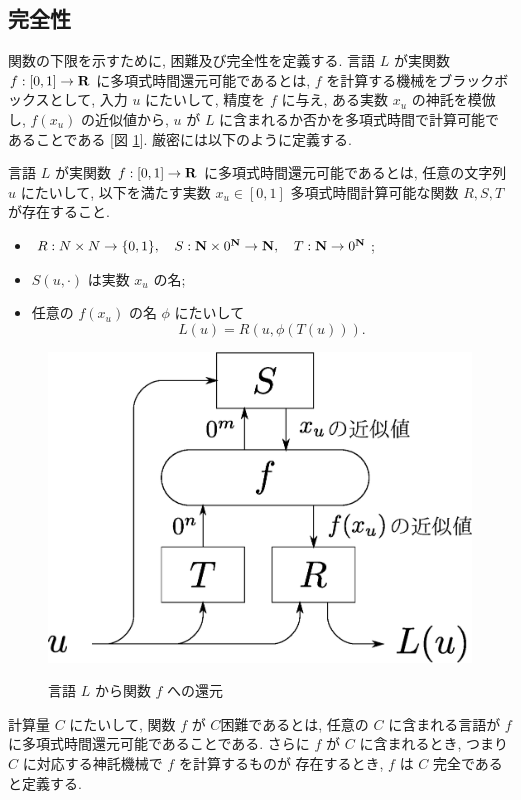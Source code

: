 \subsection{完全性}

 関数の下限を示すために, 困難及び完全性を定義する.
 言語 $L$ が実関数 $f:[0,1] \to \mathbf R$ に多項式時間還元可能であるとは,
 $f$ を計算する機械をブラックボックスとして, 入力 $u$ にたいして,
 精度を $f$ に与え, ある実数 $x_u$ の神託を模倣し, $f(x_u)$ の近似値から,
 $u$ が $L$ に含まれるか否かを多項式時間で計算可能であることである
 [図 \ref{fig:reduction}].
 厳密には以下のように定義する.

 \begin{definition}[多項式時間還元可能]
  言語 $L$ が実関数 $f:[0,1] \to \mathbf R$ に多項式時間還元可能であるとは, 
  任意の文字列 $u$ にたいして, 以下を満たす実数 $x_u \in [0,1]$
  多項式時間計算可能な関数 $R,S,T$ が存在すること.
  \begin{itemize}
   \item $R:N \times N \to \{0,1\}, \quad S:\mathbf N\times 0^\mathbf N \to \mathbf N, \quad
  T:\mathbf N \to 0^\mathbf N$;
   \item $S(u, \cdot)$ は実数 $x_u$ の名;
   \item 任意の $f(x_u)$ の名 $\phi$ にたいして
	 \[
	  L(u) = R(u, \phi(T(u))).
	 \]
  \end{itemize}
 \end{definition}

 \begin{figure}
  \begin{center}
  \label{fig:reduction}
  \includegraphics[height=0.2\textheight]{image/reduction.eps}
  \caption{言語 $L$ から関数 $f$ への還元}
  \end{center}
 \end{figure}

 計算量 $C$ にたいして, 関数 $f$ が $C$困難であるとは,
 任意の $C$ に含まれる言語が $f$ に多項式時間還元可能であることである.
 さらに $f$ が $C$ に含まれるとき, つまり $C$ に対応する神託機械で $f$ を計算するものが
 存在するとき, $f$ は $C$ 完全であると定義する.
 
